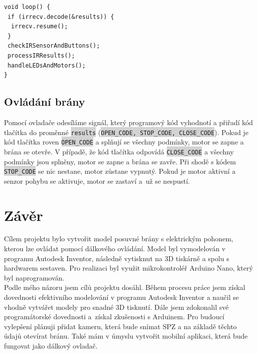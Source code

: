 \documentclass[12pt, a4paper, twoside]{report}
\newcommand{\code}[1]{\colorbox{lightgray}{\texttt{#1}}}
\begin{document}
	
\begin{lstlisting}[style=c++]
void loop() {
 if (irrecv.decode(&results)) {
  irrecv.resume();
 }
 checkIRSensorAndButtons();
 processIRResults();
 handleLEDsAndMotors();
}
\end{lstlisting}
	
	\section{Ovládání brány}
	\noindent Pomocí ovladače odesíláme signál, který programový kód vyhodnotí a přiřadí kód tlačítka do proměnné \code{results} (\code{OPEN\_CODE, STOP\_CODE, CLOSE\_CODE}). Pokud je kód tlačítka roven \code{OPEN\_CODE} a splňují se všechny podmínky, motor se zapne a brána se otevře. V případě, že kód tlačítka odpovídá \code{CLOSE\_CODE} a všechny podmínky jsou splněny, motor se zapne a brána se zavře. Při shodě s kódem \code{STOP\_CODE} se nic nestane, motor zůstane vypnutý. Pokud je motor aktivní a senzor pohybu se aktivuje, motor se zastaví a~už se nespustí. \\
	
	
	\newpage
	
	\chapter*{Závěr}
	
	\noindent Cílem projektu bylo vytvořit model posuvné brány s elektrickým pohonem, kterou lze ovládat pomocí dálkového ovládání. Model byl vymodelován v programu Autodesk Inventor, následně vytisknut na 3D tiskárně a spolu s hardwarem sestaven. Pro realizaci byl využit mikrokontroléř Arduino Nano, který byl naprogramován. \\
	
	\noindent Podle mého názoru jsem cílů projektu dosáhl. Během procesu práce jsem získal dovednosti efektivního modelování v programu Autodesk Inventor a naučil se vhodně vytvářet modely pro snadné 3D tisknutí. Dále jsem zdokonalil své programátorské dovednosti a~získal zkušenosti s Arduinem. Pro budoucí vylepšení plánuji přidat kameru, která bude snímat SPZ a na základě těchto údajů otevírat bránu. Také mám v úmyslu vytvořit mobilní aplikaci, která bude fungovat jako dálkový ovladač. \\
		
\end{document}
